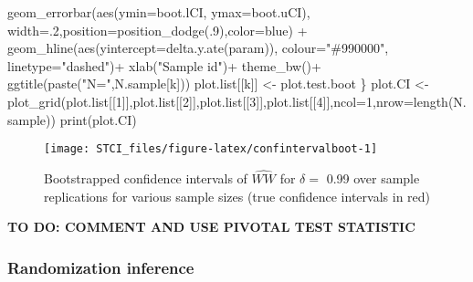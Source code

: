 \documentclass[
]{book}
\newenvironment{Shaded}{\begin{snugshade}}{\end{snugshade}}
\newcommand{\AttributeTok}[1]{\textcolor[rgb]{0.77,0.63,0.00}{#1}}
\newcommand{\DecValTok}[1]{\textcolor[rgb]{0.00,0.00,0.81}{#1}}
\newcommand{\FunctionTok}[1]{\textcolor[rgb]{0.00,0.00,0.00}{#1}}
\newcommand{\NormalTok}[1]{#1}
\newcommand{\OtherTok}[1]{\textcolor[rgb]{0.56,0.35,0.01}{#1}}
\newcommand{\SpecialCharTok}[1]{\textcolor[rgb]{0.00,0.00,0.00}{#1}}
\newcommand{\StringTok}[1]{\textcolor[rgb]{0.31,0.60,0.02}{#1}}
\theoremstyle{definition}
\theoremstyle{definition}
\theoremstyle{definition}
\theoremstyle{definition}
\theoremstyle{remark}
\begin{document}
\begin{Shaded}
\begin{Highlighting}[]
     \FunctionTok{geom\_errorbar}\NormalTok{(}\FunctionTok{aes}\NormalTok{(}\AttributeTok{ymin=}\NormalTok{boot.lCI, }\AttributeTok{ymax=}\NormalTok{boot.uCI), }\AttributeTok{width=}\NormalTok{.}\DecValTok{2}\NormalTok{,}\AttributeTok{position=}\FunctionTok{position\_dodge}\NormalTok{(.}\DecValTok{9}\NormalTok{),}\AttributeTok{color=}\StringTok{\textquotesingle{}blue\textquotesingle{}}\NormalTok{) }\SpecialCharTok{+}
     \FunctionTok{geom\_hline}\NormalTok{(}\FunctionTok{aes}\NormalTok{(}\AttributeTok{yintercept=}\FunctionTok{delta.y.ate}\NormalTok{(param)), }\AttributeTok{colour=}\StringTok{"\#990000"}\NormalTok{, }\AttributeTok{linetype=}\StringTok{"dashed"}\NormalTok{)}\SpecialCharTok{+}
     \FunctionTok{xlab}\NormalTok{(}\StringTok{"Sample id"}\NormalTok{)}\SpecialCharTok{+}
     \FunctionTok{theme\_bw}\NormalTok{()}\SpecialCharTok{+}
     \FunctionTok{ggtitle}\NormalTok{(}\FunctionTok{paste}\NormalTok{(}\StringTok{"N="}\NormalTok{,N.sample[k]))}
\NormalTok{ plot.list[[k]] }\OtherTok{\textless{}{-}}\NormalTok{ plot.test.boot}
\NormalTok{\}}
\NormalTok{plot.CI }\OtherTok{\textless{}{-}} \FunctionTok{plot\_grid}\NormalTok{(plot.list[[}\DecValTok{1}\NormalTok{]],plot.list[[}\DecValTok{2}\NormalTok{]],plot.list[[}\DecValTok{3}\NormalTok{]],plot.list[[}\DecValTok{4}\NormalTok{]],}\AttributeTok{ncol=}\DecValTok{1}\NormalTok{,}\AttributeTok{nrow=}\FunctionTok{length}\NormalTok{(N.sample))}
\FunctionTok{print}\NormalTok{(plot.CI)}
\end{Highlighting}
\end{Shaded}

\begin{figure}[htbp]

{\centering \texttt{[image: STCI\_files/figure-latex/confintervalboot-1]} 

}

\caption{Bootstrapped confidence intervals of $\hat{WW}$ for $\delta=$ 0.99 over sample replications for various sample sizes (true confidence intervals in red)}\label{fig:confintervalboot}
\end{figure}

\textbf{TO DO: COMMENT AND USE PIVOTAL TEST STATISTIC}

\hypertarget{randomization-inference}{%
\subsubsection{Randomization inference}\label{randomization-inference}}
\end{document}
